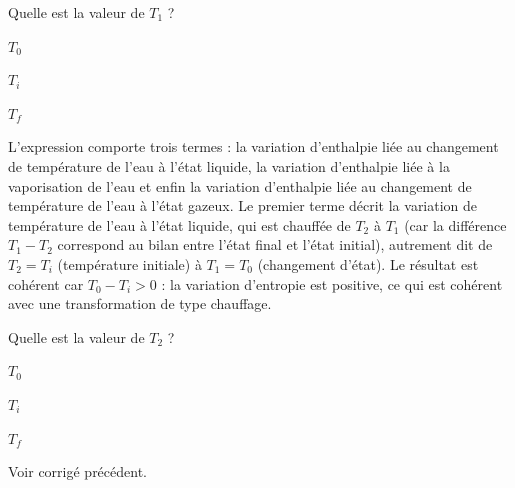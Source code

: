 
\begin{enonce}	
	Quelle est la valeur de $T_1$ ?
	\begin{listeQCM4Colonnes}
	\item $T_0$
	\item $T_i$
	\item $T_f$
	\end{listeQCM4Colonnes}
\end{enonce}

\reponse{\reponseA}

\begin{corrige}
L'expression comporte trois termes : la variation d'enthalpie liée au changement de température de l'eau à l'état liquide, la variation d'enthalpie liée à la vaporisation de l'eau et enfin la variation d'enthalpie liée au changement de température de l'eau à l'état gazeux. Le premier terme décrit la variation de température de l'eau à l'état liquide, qui est chauffée de $T_2$ à $T_1$ (car la différence $T_1-T_2$ correspond au bilan entre l'état final et l'état initial), autrement dit de $T_2=T_i$ (température initiale) à $T_1=T_0$ (changement d'état). Le résultat est cohérent car $T_0-T_i>0$ : la variation d'entropie est positive, ce qui est cohérent avec une transformation de type chauffage.
\end{corrige}



\begin{enonce}	
	Quelle est la valeur de $T_2$ ?
	\begin{listeQCM4Colonnes}
	\item $T_0$
	\item $T_i$
	\item $T_f$
	\end{listeQCM4Colonnes}
\end{enonce}

\reponse{\reponseB}

\begin{corrige}
Voir corrigé précédent.
\end{corrige}


